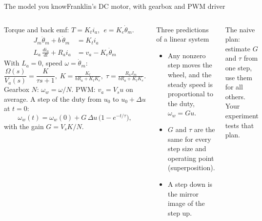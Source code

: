 %
\begin{frame}{The model you know}{Franklin's DC motor, with gearbox and PWM driver}
  \footnotesize
  \setlength{\abovedisplayskip}{2pt}\setlength{\belowdisplayskip}{2pt}
  \begin{columns}[T]
    Torque and back emf: $T = K_t i_a$, $\;e = K_e\dot\theta_m$.
    \begin{align*}
      J_m\ddot\theta_m + b\,\dot\theta_m &= K_t i_a\\
      L_a\,\tfrac{di_a}{dt} + R_a i_a &= v_a - K_e\dot\theta_m
    \end{align*}
    With $L_a = 0$, speed $\omega = \dot\theta_m$:
    \[
      \frac{\Omega(s)}{V_a(s)} = \frac{K}{\tau s + 1},\;
      K = \tfrac{K_t}{bR_a + K_tK_e},\; \tau = \tfrac{R_aJ_m}{bR_a + K_tK_e}.
    \]
    Gearbox $N$: $\omega_w = \omega/N$. PWM: $v_a = V_s u$ on average.
    A step of the duty from $u_0$ to $u_0 + \Delta u$ at $t = 0$:
    \[
      \omega_w(t) = \omega_w(0) + G\,\Delta u\,\big(1 - e^{-t/\tau}\big),
    \]
    with the gain $G = V_sK/N$.
    \begin{block}{\footnotesize Three predictions of a linear system}
      \scriptsize
      \begin{itemize}\setlength{\itemsep}{2pt}
        \item[\textbf{P1}] Any nonzero step moves the wheel, and the steady speed is proportional to the duty, $\omega_w = Gu$.
        \item[\textbf{P2}] $G$ and $\tau$ are the same for every step size and operating point (superposition).
        \item[\textbf{P3}] A step down is the mirror image of the step up.
      \end{itemize}
    \end{block}
    \vspace{3pt}
    The naive plan: estimate $G$ and $\tau$ from one step, use them for all others.
    \alert{Your experiment tests that plan.}
  \end{columns}
\end{frame}
